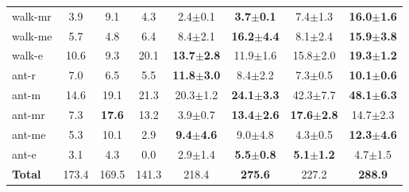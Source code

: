 \documentclass[11pt]{article}
\begin{document}
\begin{table}[htbp]
{\begin{tabular}{l|ccc|cc|cc}
    walk-mr & 3.9 & 9.1 & 4.3 & 2.4$\pm$0.1 & \textbf{3.7$\pm$0.1} & 7.4$\pm$1.3 & \textbf{16.0$\pm$1.6} \\
    walk-me & 5.7 & 4.8 & 6.4 & 8.4$\pm$2.1 & \textbf{16.2$\pm$4.4} & 8.1$\pm$2.4 & \textbf{15.9$\pm$3.8} \\
    walk-e & 10.6 & 9.3 & 20.1 & \textbf{13.7$\pm$2.8} & 11.9$\pm$1.6 & 15.8$\pm$2.0 & \textbf{19.3$\pm$1.2} \\
    ant-r & 7.0 & 6.5 & 5.5 & \textbf{11.8$\pm$3.0} & 8.4$\pm$2.2 & 7.3$\pm$0.5 & \textbf{10.1$\pm$0.6} \\
    ant-m & 14.6 & 19.1 & 21.3 & 20.3$\pm$1.2 & \textbf{24.1$\pm$3.3} & 42.3$\pm$7.7 & \textbf{48.1$\pm$6.3} \\
    ant-mr & 7.3 & \textbf{17.6} & 13.2 & 3.9$\pm$0.7 & \textbf{13.4$\pm$2.6} & \textbf{17.6$\pm$2.8} & 14.7$\pm$2.3 \\
    ant-me & 5.3 & 10.1 & 2.9 & \textbf{9.4$\pm$4.6} & 9.0$\pm$4.8 & 4.3$\pm$0.5 & \textbf{12.3$\pm$4.6} \\
    ant-e & 3.1 & 4.3 & 0.0 & 2.9$\pm$1.4 & \textbf{5.5$\pm$0.8} & \textbf{5.1$\pm$1.2} & 4.7$\pm$1.5 \\ 
    \midrule
    \textbf{Total} & 173.4 & 169.5 & 141.3 & 218.4 & \textbf{275.6} & 227.2 & \textbf{288.9} \\ 
    \bottomrule
    \end{tabular}
}
\end{table}
\end{document}
